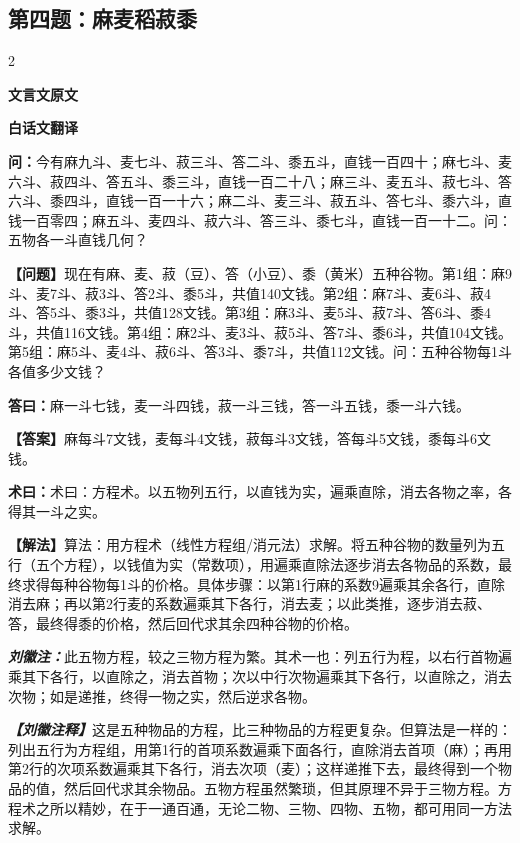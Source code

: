 \documentclass[10pt,a4paper]{article}
\newcommand{\wen}[1]{\textbf{\color{problemcolor}问：}#1\par}
\newcommand{\da}[1]{\textbf{答曰：}#1\par}
\newcommand{\shu}[1]{\textbf{术曰：}#1\par}
\newcommand{\liuhui}[1]{{\color{commentarycolor}\textit{\textbf{刘徽注：}}#1\par}}
\newcommand{\classicalheader}[1]{{\centering\large\bfseries\color{classicalcolor} #1\par\vspace{0.5em}}}
\newcommand{\wenmodern}[1]{\textbf{\color{moderncolor}【问题】}#1\par}
\newcommand{\damodern}[1]{\textbf{【答案】}#1\par}
\newcommand{\shumodern}[1]{\textbf{【解法】}#1\par}
\newcommand{\liuhuimodern}[1]{{\color{commentarycolor}\textit{\textbf{【刘徽注释】}}#1\par}}
\newcommand{\modernheader}[1]{{\centering\large\bfseries\color{moderncolor} #1\par\vspace{0.5em}}}
\newcommand{\problemsec}[1]{\subsection*{#1}}
\begin{document}
\problemsec{第四题：麻麦稻菽黍}
\begin{paracol}{2}
\classicalheader{文言文原文}
\switchcolumn
\modernheader{白话文翻译}
\switchcolumn*

\wen{今有麻九斗、麦七斗、菽三斗、答二斗、黍五斗，直钱一百四十；麻七斗、麦六斗、菽四斗、答五斗、黍三斗，直钱一百二十八；麻三斗、麦五斗、菽七斗、答六斗、黍四斗，直钱一百一十六；麻二斗、麦三斗、菽五斗、答七斗、黍六斗，直钱一百零四；麻五斗、麦四斗、菽六斗、答三斗、黍七斗，直钱一百一十二。问：五物各一斗直钱几何？}

\switchcolumn

\wenmodern{现在有麻、麦、菽（豆）、答（小豆）、黍（黄米）五种谷物。第1组：麻9斗、麦7斗、菽3斗、答2斗、黍5斗，共值140文钱。第2组：麻7斗、麦6斗、菽4斗、答5斗、黍3斗，共值128文钱。第3组：麻3斗、麦5斗、菽7斗、答6斗、黍4斗，共值116文钱。第4组：麻2斗、麦3斗、菽5斗、答7斗、黍6斗，共值104文钱。第5组：麻5斗、麦4斗、菽6斗、答3斗、黍7斗，共值112文钱。问：五种谷物每1斗各值多少文钱？}

\switchcolumn*

\da{麻一斗七钱，麦一斗四钱，菽一斗三钱，答一斗五钱，黍一斗六钱。}

\switchcolumn

\damodern{麻每斗7文钱，麦每斗4文钱，菽每斗3文钱，答每斗5文钱，黍每斗6文钱。}

\switchcolumn*

\shu{术曰：方程术。以五物列五行，以直钱为实，遍乘直除，消去各物之率，各得其一斗之实。}

\switchcolumn

\shumodern{算法：用方程术（线性方程组/消元法）求解。将五种谷物的数量列为五行（五个方程），以钱值为实（常数项），用遍乘直除法逐步消去各物品的系数，最终求得每种谷物每1斗的价格。具体步骤：以第1行麻的系数9遍乘其余各行，直除消去麻；再以第2行麦的系数遍乘其下各行，消去麦；以此类推，逐步消去菽、答，最终得黍的价格，然后回代求其余四种谷物的价格。}

\switchcolumn*

\liuhui{此五物方程，较之三物方程为繁。其术一也：列五行为程，以右行首物遍乘其下各行，以直除之，消去首物；次以中行次物遍乘其下各行，以直除之，消去次物；如是递推，终得一物之实，然后逆求各物。}

\switchcolumn

\liuhuimodern{这是五种物品的方程，比三种物品的方程更复杂。但算法是一样的：列出五行为方程组，用第1行的首项系数遍乘下面各行，直除消去首项（麻）；再用第2行的次项系数遍乘其下各行，消去次项（麦）；这样递推下去，最终得到一个物品的值，然后回代求其余物品。五物方程虽然繁琐，但其原理不异于三物方程。方程术之所以精妙，在于一通百通，无论二物、三物、四物、五物，都可用同一方法求解。}

\end{paracol}
\end{document}

